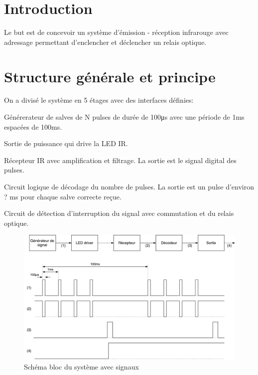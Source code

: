 \documentclass[french]{layout/Report}
\begin{document}


\section{Introduction}
Le but est de concevoir un système d'émission - réception infrarouge avec adressage
permettant d'enclencher et déclencher un relais optique.

\section{Structure générale et principe}

On a divisé le système en 5 étages avec des interfaces définies:

\begin{description}[leftmargin=!,labelwidth=4cm]
\item[Générateur de signal] Générerateur de salves de N pulses de durée de 100\si{\micro\second} avec une période de 1\si{\milli\second} espacées de 100\si{\milli\second}.
\item[LED driver] Sortie de puissance qui drive la LED IR.
\item[Récepteur] Récepteur IR avec amplification et filtrage. La sortie est le signal digital des pulses.
\item[Décodeur] Circuit logique de décodage du nombre de pulses. La sortie est un pulse d'environ ? \si{\milli\second} pour chaque salve correcte reçue.
\item[Sortie] Circuit de détection d'interruption du signal avec commutation et  du relais optique.
\end{description}

\begin{figure}[h]
\centering
\vspace{5mm}
\includegraphics[width=\textwidth]{fig/IRemote_schema_structure}
\caption{Schéma bloc du système avec signaux}
\label{fig:schema_bloc}
\vspace{5mm}
\end{figure}
\end{document}
